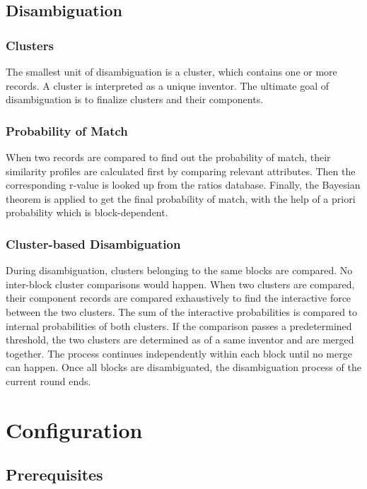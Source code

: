 \documentclass{article}
\begin{document}
\subsection{Disambiguation}


\subsubsection{Clusters}

The smallest unit of disambiguation is a cluster,
which contains one or more records. A cluster is
interpreted as a unique inventor. The ultimate
goal of disambiguation is to finalize clusters
and their components.


\subsubsection{Probability of Match}

When two records are compared to find out the probability
of match, their similarity profiles are calculated first
by comparing relevant attributes. Then the corresponding
r-value is looked up from the ratios database. Finally, the
Bayesian theorem is applied to get the final probability
of match, with the help of a priori probability which
is block-dependent.



\subsubsection{Cluster-based Disambiguation}

During disambiguation, clusters belonging to the same
blocks are compared. No inter-block cluster comparisons
would happen. When two clusters are compared, their
component records are compared exhaustively to find the
interactive force between the two clusters. The sum of
the interactive probabilities is compared to internal
probabilities of both clusters. If the comparison passes a
predetermined threshold, the two clusters are determined
as of a same inventor and are merged together. The process
continues independently within each block until no merge
can happen. Once all blocks are disambiguated, the
disambiguation process of the current round ends.


\section{Configuration}


\subsection{Prerequisites}
\end{document}
